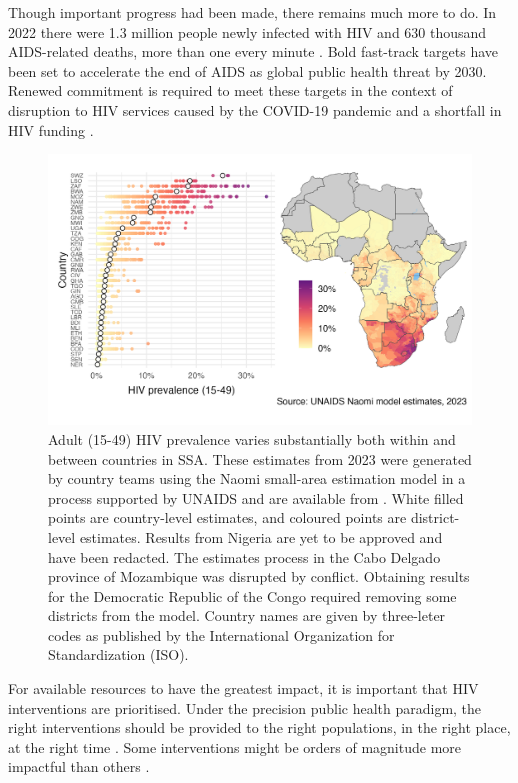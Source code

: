 \documentclass[a4paper, nobind]{templates/ociamthesis}
\begin{document}
Though important progress had been made, there remains much more to do.
In 2022 there were 1.3 million people newly infected with HIV and 630 thousand AIDS-related deaths, more than one every minute \autocite{unaids2022global}.
Bold fast-track targets have been set to accelerate the end of AIDS as global public health threat by 2030.
Renewed commitment is required to meet these targets in the context of disruption to HIV services caused by the COVID-19 pandemic and a shortfall in HIV funding \autocite{economist2023triple}.



\begin{figure}

{\centering \includegraphics[width=0.95\linewidth]{figures/hiv-aids/naomi-continent} 

}

\caption{Adult (15-49) HIV prevalence varies substantially both within and between countries in SSA. These estimates from 2023 were generated by country teams using the Naomi small-area estimation model in a process supported by UNAIDS and are available from \textcite{unaids2023aidsinfo}. White filled points are country-level estimates, and coloured points are district-level estimates. Results from Nigeria are yet to be approved and have been redacted. The estimates process in the Cabo Delgado province of Mozambique was disrupted by conflict. Obtaining results for the Democratic Republic of the Congo required removing some districts from the model. Country names are given by three-leter codes as published by the International Organization for Standardization (ISO).}\label{fig:naomi-continent}
\end{figure}

For available resources to have the greatest impact, it is important that HIV interventions are prioritised.
Under the precision public health paradigm, the right interventions should be provided to the right populations, in the right place, at the right time \autocite{khoury2016precision}.
Some interventions might be orders of magnitude more impactful than others \autocite{ord2013moral}.
\end{document}

